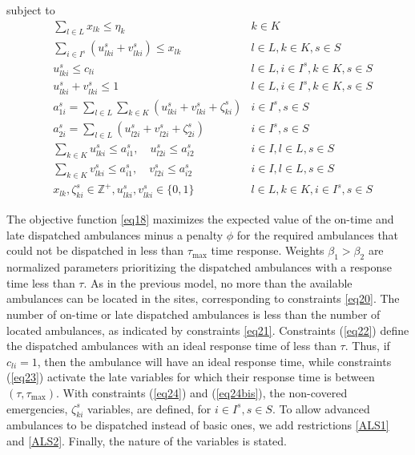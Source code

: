 subject to
\begin{align}
  &  \sum_{l \in L} x_{lk} \leq \eta_k  & k \in K \label{eq20}  
  \\
  &    \sum_{i\in I^s}(u_{lki}^s + v_{lki}^s) \leq x_{lk} &   l \in L,   k \in K,  s \in S  
   \label{eq21}  \\  
  &  u_{lki}^s \leq c_{li}  & l \in L,  i \in I^s,   k \in K,  s \in S    \label{eq22}\\
  &  u_{lki}^s + v_{lki}^s \leq 1 & l \in L,    i \in I^s,   k \in K,   s \in S
    \label{eq23}\\
    & a_{1i}^s = \sum_{l \in L}\sum_{k \in K}( u_{lki}^s + v_{lki}^s + \zeta_{ki}^s )  & i \in I^s, s \in S
    \label{eq24}\\
    &   a_{2i}^s = \sum_{l \in L}( u_{l2i}^s + v_{l2i}^s + \zeta_{2i}^s )  & i \in I^s, s \in S
    \label{eq24bis}\\
     & \sum_{k\in K}  u_{lki}^s \leq  a_{i1}^s , \quad u_{l2i}^s \leq a_{i2}^s &  i \in I, l \in L,  s \in S
    \label{ALS1}\\
    & \sum_{k\in K} v_{lki}^s \leq a_{i1}^s, \quad v_{l2i}^s \leq a_{i2}^s  &  i \in I, l \in L,  s \in S
    \label{ALS2}\\
   & x_{lk}, \zeta_{ki}^s \in \mathbb{Z}^+, u_{lki}^s, v_{lki}^s \in \{ 0,1 \}  & l \in L,   k \in K, i \in I^s, s \in S      \nonumber
\end{align}

The objective function \eqref{eq18} maximizes the expected value of the on-time and late dispatched ambulances minus a penalty $\phi$ for the required ambulances that could not be dispatched in less than $\tau_{\max}$ time response. Weights $\beta_1 > \beta_2$ are normalized parameters prioritizing the dispatched ambulances with a response time less than $\tau$. As in the previous model, no more than the available ambulances can be located in the sites, corresponding to constraints \eqref{eq20}. The number of on-time or late dispatched ambulances is less than the number of located ambulances, as indicated by constraints \eqref{eq21}. Constraints (\ref{eq22}) define the dispatched ambulances with an ideal response time of less than $\tau$. Thus, if $c_{li}=1$, then the ambulance will have an ideal response time, while constraints (\ref{eq23}) activate the late variables for which their response time is between $(\tau, \tau_{\max})$. With constraints (\ref{eq24}) and (\ref{eq24bis}), the non-covered emergencies, $\zeta_{ki}^s$ variables, are defined, for $i \in I^s, s \in S$. To allow advanced ambulances to be dispatched instead of basic ones, we add restrictions \eqref{ALS1} and \eqref{ALS2}. Finally, the nature of the variables is stated. 
 
